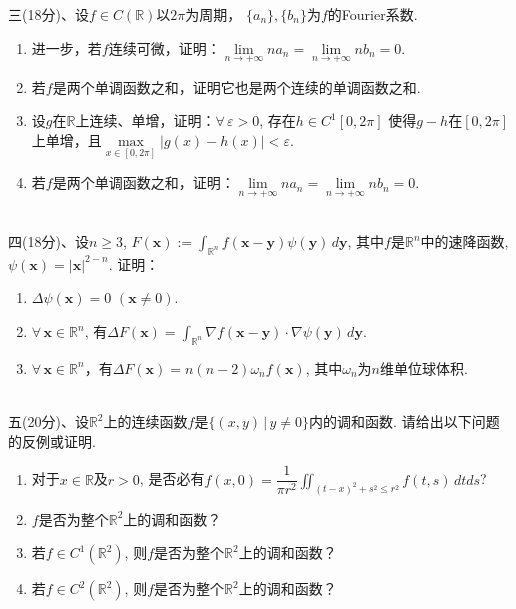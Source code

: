 三(18分)、设$f\in C(\mathbb{R})$以$2\pi$为周期，
$\{a_n\}, \{b_n\}$为$f$的Fourier系数.
\begin{enumerate}[label=(\arabic*)]
\item 进一步，若$f$连续可微，证明：$\lim \limits_{n\to +\infty}na_n
=\lim \limits_{n\to +\infty}nb_n=0$.
\item 若$f$是两个单调函数之和，证明它也是两个连续的单调函数之和.
\item 设$g$在$\mathbb{R}$上连续、单增，证明：$\forall \, \varepsilon > 0$, 存在$h\in C^1[0,2\pi]$
使得$g-h$在$[0,2\pi]$上单增，且$\max \limits_{x\in [0,2\pi]}|g(x)-h(x)|<\varepsilon$.
\item 若$f$是两个单调函数之和，证明：$\lim \limits_{n\to +\infty}na_n
=\lim \limits_{n\to +\infty}nb_n=0$.
\end{enumerate}
~\\
四(18分)、设$n\ge 3$, $\displaystyle F(\mathbf{x}):=\int_{\mathbb{R}^n}f(\mathbf{x}-\mathbf{y})\psi(\mathbf{y})\, d\mathbf{y}$, 
其中$f$是$\mathbb{R}^n$中的速降函数, $\psi(\mathbf{x})=|\mathbf{x}|^{2-n}$. 证明：
\begin{enumerate}[label=(\arabic*)]
    \item $\Delta \psi (\mathbf{x})=0$ $(\mathbf{x}\ne 0)$.
    \item $\forall \, \mathbf{x}\in \mathbb{R}^n$, 有$\displaystyle
    \Delta F(\mathbf{x})=\int_{\mathbb{R}^n}\nabla f(\mathbf{x}-\mathbf{y})\cdot \nabla
    \psi (\mathbf{y}) \, d\mathbf{y}$.
    \item $\forall \, \mathbf{x}\in \mathbb{R}^n$，有$\displaystyle \Delta F(\mathbf{x})=
    n(n-2)\omega_n f(\mathbf{x})$, 其中$\omega_n$为$n$维单位球体积.
\end{enumerate}
~\\
五(20分)、设$\mathbb{R}^2$上的连续函数$f$是$\{(x,y)\,\big|\,y\ne 0 \}$内的调和函数. 
请给出以下问题的反例或证明.
\begin{enumerate}[label=(\arabic*)]
    \item 对于$x\in \mathbb{R}$及$r>0$, 是否必有$f(x,0)=\displaystyle \dfrac{1}{\pi r^2}\iint _{(t-x)^2+s^2\le r^2}f(t,s)\, dtds$?
    \item $f$是否为整个$\mathbb{R}^2$上的调和函数？
    \item 若$f\in C^1(\mathbb{R}^2)$, 则$f$是否为整个$\mathbb{R}^2$上的调和函数？
    \item 若$f\in C^2(\mathbb{R}^2)$, 则$f$是否为整个$\mathbb{R}^2$上的调和函数？
\end{enumerate}

